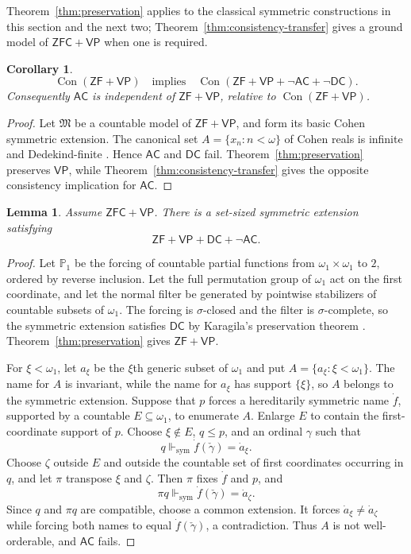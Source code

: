 \documentclass[11pt,a4paper]{amsart}
\newcommand{\VP}{\mathsf{VP}}
\newcommand{\AC}{\mathsf{AC}}
\newcommand{\ZF}{\mathsf{ZF}}
\newcommand{\ZFC}{\mathsf{ZFC}}
\newcommand{\Con}{\operatorname{Con}}
\newcommand{\forcesS}{\Vdash_{\mathrm{sym}}}
\newcommand{\DC}{\mathsf{DC}}
\theoremstyle{plain}
\newtheorem{lemma}[theorem]{Lemma}
\newtheorem{corollary}[theorem]{Corollary}
\theoremstyle{definition}
\theoremstyle{remark}
\begin{document}
Theorem~\ref{thm:preservation} applies to the classical symmetric constructions in this section and the next two; Theorem~\ref{thm:consistency-transfer} gives a ground model of $\ZFC+\VP$ when one is required.

\begin{corollary}\label{cor:choice}
\[
\Con(\ZF+\VP)\quad\text{implies}\quad
\Con(\ZF+\VP+\neg\AC+\neg\DC).
\]
Consequently $\AC$ is independent of $\ZF+\VP$, relative to $\Con(\ZF+\VP)$.
\end{corollary}

\begin{proof}
Let $\mathfrak M$ be a countable model of $\ZF+\VP$, and form its basic Cohen symmetric extension.  The canonical set $A=\{x_n:n<\omega\}$ of Cohen reals is infinite and Dedekind-finite \cite[Section~5.3]{Jech}.  Hence $\AC$ and $\DC$ fail.  Theorem~\ref{thm:preservation} preserves $\VP$, while Theorem~\ref{thm:consistency-transfer} gives the opposite consistency implication for $\AC$.
\end{proof}

\begingroup

\begin{lemma}\label{lem:omega1-Cohen}
Assume $\ZFC+\VP$.  There is a set-sized symmetric extension satisfying
\[
\ZF+\VP+\DC+\neg\AC.
\]
\end{lemma}

\begin{proof}
Let $\mathbb P_1$ be the forcing of countable partial functions from $\omega_1\times\omega_1$ to $2$, ordered by reverse inclusion.  Let the full permutation group of $\omega_1$ act on the first coordinate, and let the normal filter be generated by pointwise stabilizers of countable subsets of $\omega_1$.  The forcing is $\sigma$-closed and the filter is $\sigma$-complete, so the symmetric extension satisfies $\DC$ by Karagila's preservation theorem \cite[Lemma~3.1]{KaragilaDC}.  Theorem~\ref{thm:preservation} gives $\ZF+\VP$.

For $\xi<\omega_1$, let $a_\xi$ be the $\xi$th generic subset of $\omega_1$ and put $A=\{a_\xi:\xi<\omega_1\}$.  The name for $A$ is invariant, while the name for $a_\xi$ has support $\{\xi\}$, so $A$ belongs to the symmetric extension.  Suppose that $p$ forces a hereditarily symmetric name $\dot f$, supported by a countable $E\subseteq\omega_1$, to enumerate $A$.  Enlarge $E$ to contain the first-coordinate support of $p$.  Choose $\xi\notin E$, $q\leq p$, and an ordinal $\gamma$ such that
\[
q\forcesS\dot f(\check\gamma)=\dot a_\xi.
\]
Choose $\zeta$ outside $E$ and outside the countable set of first coordinates occurring in $q$, and let $\pi$ transpose $\xi$ and $\zeta$.  Then $\pi$ fixes $\dot f$ and $p$, and
\[
\pi q\forcesS\dot f(\check\gamma)=\dot a_\zeta.
\]
Since $q$ and $\pi q$ are compatible, choose a common extension.  It forces $\dot a_\xi\neq\dot a_\zeta$ while forcing both names to equal $\dot f(\check\gamma)$, a contradiction.  Thus $A$ is not well-orderable, and $\AC$ fails.
\end{proof}
\end{document}
